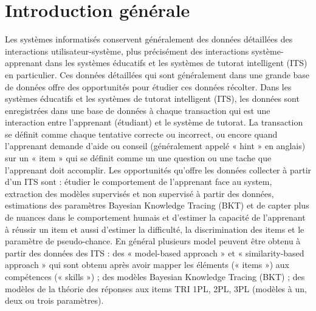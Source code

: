 \chapter*{Introduction générale}
Les systèmes informatisés conservent généralement des données détaillées des interactions utilisateur-système, plus précisément des interactions système-apprenant dans les systèmes éducatifs et les systèmes de tutorat intelligent (ITS) en particulier. Ces données détaillées qui sont généralement dans une grande base de données offre des opportunités pour étudier ces données récolter. Dans les systèmes éducatifs et les systèmes de tutorat intelligent (ITS), les données sont enregistrées dans une base de données à chaque transaction qui est une interaction entre l'apprenant (étudiant) et le système de tutorat. La transaction se définit comme chaque tentative correcte ou incorrect, ou encore quand l’apprenant demande d’aide ou conseil (généralement appelé « hint » en anglais) sur un « item » qui se définit comme un une question ou une tache que l’apprenant doit accomplir. Les opportunités qu’offre les données collecter à partir d’un ITS sont : étudier le comportement de l’apprenant face au system, extraction des modèles supervisés et non supervisé à partir des données, estimations des paramètres Bayesian Knowledge Tracing (BKT) et de capter plus de nuances dans le comportement humais et d’estimer la capacité de l’apprenant à réussir un item et aussi d’estimer la difficulté, la discrimination des items et le paramètre de pseudo-chance. En général plusieurs model peuvent être obtenu à partir des données des ITS : des « model-based approach » et « similarity-based approach » qui sont obtenu après avoir mapper les éléments (« items ») aux compétences (« skills ») ; des modèles Bayesian Knowledge Tracing (BKT) ; des modèles de la théorie des réponses aux items TRI 1PL, 2PL, 3PL (modèles à un, deux ou trois paramètres). \\

